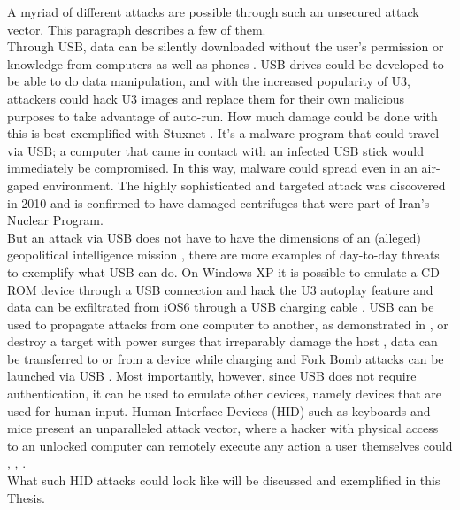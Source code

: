 A myriad of different attacks are possible through such an unsecured attack vector. This paragraph describes a few of them. \\
Through USB, data can be silently downloaded without the user's permission or knowledge from computers \cite{clarkHardwareTrojanHorse2009} as well as phones \cite{SharpIdeasDownloads2006}. USB drives could be developed to be able to do data manipulation, and with the increased popularity of U3, attackers could hack U3 images and replace them for their own malicious purposes to take advantage of auto-run. 
How much damage could be done with this is best exemplified with Stuxnet \cite{kushnerRealStoryStuxnet2013}. It's a malware program that could travel via USB; a computer that came in contact with an infected USB stick would immediately be compromised. In this way, malware could spread even in an air-gaped environment. The highly sophisticated and targeted attack was discovered in 2010 and is confirmed to have damaged centrifuges that were part of Iran's Nuclear Program.\\
But an attack via USB does not have to have the dimensions of an (alleged) geopolitical intelligence mission \cite{kushnerRealStoryStuxnet2013}, there are more examples of day-to-day threats to exemplify what USB can do. On Windows XP it is possible to emulate a CD-ROM device through a USB connection and hack the U3 autoplay feature \cite{al-zarouniRealityRisksConsented2006} and data can be exfiltrated from iOS6 through a USB charging cable \cite{lauMactansInjectingMalware2013}. USB can be used to propagate attacks from one computer to another, as demonstrated in \cite{wangExploitingSmartphoneUSB2010}, or destroy a target with power surges that irreparably damage the host \cite{USBKillDevices}, data can be transferred to or from a device while charging \cite{kumarJuiceJackingUSB2020} and Fork Bomb attacks can be launched via USB \cite{efendyExploringPossibilityUSB2019}. Most importantly, however, since USB does not require authentication, it can be used to emulate other devices, namely devices that are used for human input. Human Interface Devices (HID) such as keyboards and mice present an unparalleled attack vector, where a hacker with physical access to an unlocked computer can remotely execute any action a user themselves could \cite{USBRubberDucky}, \cite{MGCable2019a}, \cite{lawalFacilitatingCyberenabledFraud2022}. \\
What such HID attacks could look like will be discussed and exemplified in this Thesis.


